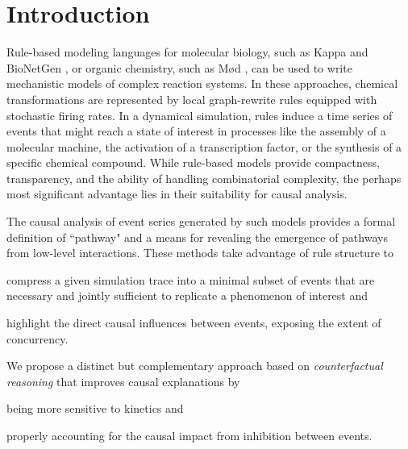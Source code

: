 
\section*{Introduction}\label{sec:intro}


Rule-based modeling languages for molecular biology, such as Kappa
\cite{DanosEtAl-CONCUR07} and BioNetGen \cite{bngl}, or organic
chemistry, such as M{\o}d \cite{moll}, can be used to write
mechanistic models of complex reaction systems. In these approaches,
chemical transformations are represented by local graph-rewrite rules
equipped with stochastic firing rates. In a dynamical simulation,
rules induce a time series of events that might reach a state of
interest in processes like the assembly of a molecular machine, the
activation of a transcription factor, or the synthesis of a specific
chemical compound. While rule-based models provide compactness,
transparency, and the ability of handling combinatorial complexity,
the perhaps most significant advantage lies in their suitability for
causal analysis.

%

The causal analysis
\cite{DBLP:conf/fsttcs/DanosFFHH12,DanosEtAl-CONCUR07} of event series
generated by such models provides a formal definition of ``pathway"
and a means for revealing the emergence of pathways from low-level
interactions. These methods take advantage of rule structure to
\begin{inparaenum}[(i)]
\item compress a given simulation trace into a minimal subset of
  events that are necessary and jointly sufficient to replicate a
  phenomenon of interest and
\item highlight the direct causal influences between events, exposing
  the extent of concurrency.
\end{inparaenum}


We propose a distinct but complementary approach based on
\textit{counterfactual reasoning} that improves causal explanations by
\begin{inparaenum}[(i)]
\item being more sensitive to kinetics and
\item properly accounting for the causal impact from inhibition
  between events.
\end{inparaenum}